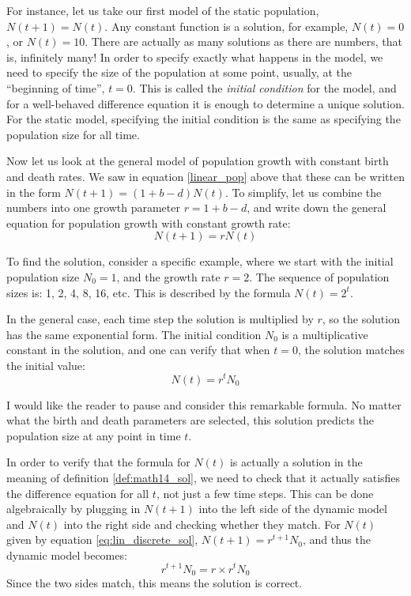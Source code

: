 \documentclass[
  letterpaper,
  DIV=11,
  numbers=noendperiod]{scrreprt}
\begin{document}
\label{def:math14_sol}

For instance, let us take our first model of the static population,
\(N(t+1) = N(t)\). Any constant function is a solution, for example,
\(N(t) = 0\), or \(N(t) = 10\). There are actually as many solutions as
there are numbers, that is, infinitely many! In order to specify exactly
what happens in the model, we need to specify the size of the population
at some point, usually, at the ``beginning of time'', \(t = 0\). This is
called the  \emph{initial condition} for the
model, and for a well-behaved difference equation it is enough to
determine a unique solution. For the static model, specifying the
initial condition is the same as specifying the population size for all
time.

Now let us look at the general model of population growth with constant
birth and death rates. We saw in equation \ref{linear_pop} above that
these can be written in the form \(N(t+1) = (1 + b - d) N(t)\). To
simplify, let us combine the numbers into one growth parameter
\(r = 1 + b - d\), and write down the general equation for population
growth with constant growth rate: \[N(t+1) =  rN(t)\]

To find the solution, consider a specific example, where we start with
the initial population size \(N_0 = 1\), and the growth rate \(r=2\).
The sequence of population sizes is: 1, 2, 4, 8, 16, etc. This is
described by the formula \(N(t) = 2^t\).

In the general case, each time step the solution is multiplied by \(r\),
so the solution has the same exponential form. The initial condition
\(N_0\) is a multiplicative constant in the solution, and one can verify
that when \(t=0\), the solution matches the initial value:
\begin{equation}
N(t)  = r^t N_0
\label{eq:lin_discrete_sol}
\end{equation}

I would like the reader to pause and consider this remarkable formula.
No matter what the birth and death parameters are selected, this
solution predicts the population size at any point in time \(t\).

In order to verify that the formula for \(N(t)\) is actually a solution
in the meaning of definition \ref{def:math14_sol}, we need to check that
it actually satisfies the difference equation for all \(t\), not just a
few time steps. This can be done algebraically by plugging in \(N(t+1)\)
into the left side of the dynamic model and \(N(t)\) into the right side
and checking whether they match. For \(N(t)\) given by equation
\ref{eq:lin_discrete_sol}, \(N(t+1) = r^{t+1} N_0\), and thus the
dynamic model becomes: \[r^{t+1} N_0 = r \times r^t N_0\] Since the two
sides match, this means the solution is
correct.
\end{document}
